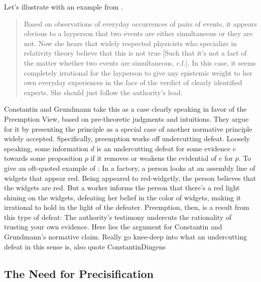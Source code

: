 \documentclass[11pt, a4paper]{scrartcl}
\begin{document}
Let's illustrate with an example from \textcite{Constantin2017}. 

\begin{singlespacing}
\begin{quote}
    Based on observations of everyday occurrences of pairs of events, it appears obvious to a layperson that two events are either simultaneous or they are not. Now she hears that widely respected physicists who specialize in relativity theory believe that this is not true [Such that it's not a fact of the matter whether two events are simultaneous, c.f.]. In this case, it seems completely irrational for the layperson to give any epistemic weight to her own everyday experiences in the face of the verdict of clearly identified experts. She should just follow the authority's lead. 
\end{quote}
\end{singlespacing}

Constantin and Grundmann take this as a case clearly speaking in favor of the Preemption View, based on pre-theoretic judgments and intuitions. They argue for it by presenting the principle as a special case of another normative principle widely accepted. Specifically, preemption works off undercutting defeat. Loosely speaking, some information $d$ is an undercutting defeat for some evidence $e$ towards some proposition $p$ if it removes or weakens the evidential of $e$ for $p$. To give an oft-quoted example of \textcite{Pollock1986}: In a factory, a person looks at an assembly line of widgets that appear red. Being appeared to red-widgetly, the person believes that the widgets are red. But a worker informs the person that there's a red light shining on the widgets, defeating her belief in the color of widgets, making it irrational to hold in the light of the defeater. Preemption, then, is a result from this type of defeat: The authority's testimony undercuts the rationality of trusting your own evidence. Here lies the argument for Constantin and Grundmann's normative claim.
{\color{red} Really go knee-deep into what an undercutting defeat in this sense is, also quote ConstantinDingens}

\subsection{The Need for Precisification}
\end{document}
